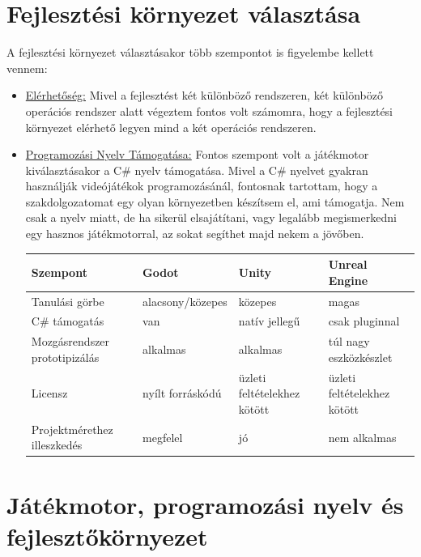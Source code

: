 \section[Fejlesztési Környezet]{Fejlesztési környezet választása}
A fejlesztési környezet választásakor több szempontot is figyelembe kellett vennem:
\begin{itemize}
	\item \underline{Elérhetőség:} Mivel a fejlesztést két különböző rendszeren, két különböző operációs rendszer alatt végeztem fontos volt számomra, hogy a fejlesztési környezet elérhető legyen mind a két operációs rendszeren.
	\item \underline{Programozási Nyelv Támogatása:} Fontos szempont volt a játékmotor kiválasztásakor a C\# nyelv támogatása. Mivel a C\# nyelvet gyakran használják videójátékok programozásánál, fontosnak tartottam, hogy a szakdolgozatomat egy olyan környezetben készítsem el, ami támogatja. Nem csak a nyelv miatt, de ha sikerül elsajátítani, vagy legalább megismerkedni egy hasznos játékmotorral, az sokat segíthet majd nekem a jövőben.\\
	\begin{tabularx}{\textwidth}{
  | >{\raggedright\arraybackslash}X
  | >{\raggedright\arraybackslash}X
  | >{\raggedright\arraybackslash}X
  | >{\raggedright\arraybackslash}X | }
	\hline
	Szempont & Godot & Unity & Unreal Engine\\
	\hline
	Tanulási görbe & alacsony/közepes & közepes & magas\\
	C\# támogatás & van & natív jellegű & csak pluginnal\\
	Mozgásrendszer prototipizálás & alkalmas & alkalmas & túl nagy eszközkészlet\\
	Licensz & nyílt forráskódú & üzleti feltételekhez kötött & üzleti feltételekhez kötött\\
	Projektmérethez illeszkedés & megfelel & jó & nem alkalmas\\
	\hline
	\end{tabularx}
\end{itemize}

\section{Játékmotor, programozási nyelv és fejlesztőkörnyezet}

